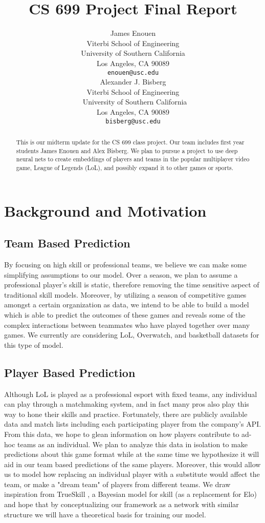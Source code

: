\documentclass{article}
\title{CS 699 Project Final Report \\
 \normalfont{DeepSkill: Win Prediction and Matchmaking Framework for Elite Individuals and Teams}}
\author{
  James Enouen\\
  Viterbi School of Engineering\\
  University of Southern California\\
  Los Angeles, CA 90089 \\
  \texttt{enouen@usc.edu} \\
   \And
  Alexander J. Bisberg \\
  Viterbi School of Engineering\\\
  University of Southern California\\
  Los Angeles, CA 90089 \\
  \texttt{bisberg@usc.edu} \\
}
\begin{document}
\maketitle

\begin{abstract}
  This is our midterm update for the CS 699 class project. Our team includes first year students James Enouen and Alex Bisberg. We plan to pursue a project to use deep neural nets to create embeddings of players and teams in the popular multiplayer video game, League of Legends (LoL), and possibly expand it to other games or sports.
\end{abstract}

\section{Background and Motivation}

\subsection{Team Based Prediction}
By focusing on high skill or professional teams, we believe we can make some simplifying assumptions to our model. 
Over a season, we plan to assume a professional player's skill is static, therefore removing the time sensitive aspect of traditional skill models.
Moreover, by utilizing a season of competitive games amongst a certain organization as data, we intend to be able to build a model which is able to predict the outcomes of these games and reveals some of the complex interactions between teammates who have played together over many games. 
We currently are considering LoL, Overwatch, and basketball datasets for this type of model.

\subsection{Player Based Prediction}
Although LoL is played as a professional esport with fixed teams, any individual can play through a matchmaking system, and in fact many pros also play this way to hone their skills and practice.
Fortunately, there are publicly available data and match lists including each participating player from the company's API.
From this data, we hope to glean information on how players contribute to ad-hoc teams as an individual. 
We plan to analyze this data in isolation to make predictions about this game format while at the same time we hypothesize it will aid in our team based predictions of the same players.
Moreover, this would allow us to model how replacing an individual player with a substitute would affect the team, or make a "dream team" of players from different teams.
We draw inspiration from TrueSkill \cite{trueskill2}, a Bayesian model for skill (as a replacement for Elo) and hope that by conceptualizing our framework as a network with similar structure we will have a theoretical basis for training our model.
\end{document}
